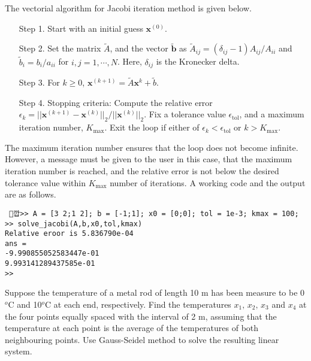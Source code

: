 \documentclass[11pt,a4paper,reqno]{article}
\begin{document}
The vectorial algorithm for Jacobi iteration method is given below. 
\begin{tcolorbox}
	[colback=magenta!5!white,colframe=pink!100!black,fonttitle=\bfseries,title=Jacobi iteration method]
	\begin{itemize}
		\item[Step 1.] Start with an initial guess ${\pmb x}^{(0)}$.
		\item[Step 2.] Set the matrix $\widetilde{A}$, and the vector $\widetilde{\pmb b}$ as $\widetilde{A}_{ij} = (\delta_{ij} - 1)A_{ij}/A_{ii}$ and $\widetilde{b}_{i} = b_{i}/a_{ii}$ for $i,j=1,\cdots,N$. Here, $\delta_{ij}$ is the Kronecker delta.
		\item[Step 3.] For $k \ge 0$, ${\pmb x}^{(k+1)} = \widetilde{A}{\pmb x}^{k} + \widetilde{b}$. 
		\item[Step 4.] Stopping criteria: Compute the relative error $\epsilon_k = ||{\pmb x}^{(k+1)} - {\pmb x}^{(k)}||_2/||{\pmb x}^{(k)}||_2$. Fix a tolerance value $\epsilon_{\mathrm{tol}}$, and a maximum iteration number, $K_{\mathrm{max}}$. Exit the loop if either of $\epsilon_k < \epsilon_{\mathrm{tol}}$ or $k > K_{\mathrm{max}}$. 
	\end{itemize}
\end{tcolorbox}
The maximum iteration number ensures that the loop does not become infinite. However, a message must be given to the user in this case, that the maximum iteration number is reached, and the relative error is not below the desired tolerance value within $K_{\max}$ number of iterations. A working code and the output are as follows.

\begin{mdframed}[style=cframe,nobreak=true,align=center]
	\begin{verbatim}
 깝>> A = [3 2;1 2]; b = [-1;1]; x0 = [0;0]; tol = 1e-3; kmax = 100;
>> solve_jacobi(A,b,x0,tol,kmax)
Relative eroor is 5.836790e-04
ans =
-9.990855052583447e-01
9.993141289437585e-01
>>
	\end{verbatim}
\end{mdframed}
\begin{problem}	 
	Suppose the temperature of a metal rod of length 10 m has been measure to be 0$^o$C and 10$^o$C at each end, respectively. Find the temperatures $x_1,\,x_2,\,x_3$ and $x_4$ at the four points equally spaced with the interval of 2 m, assuming that the temperature at each point is the average of the temperatures of both neighbouring points. Use Gauss-Seidel method to solve the resulting linear system. \label{pr:pr_3}
\end{problem}
\end{document}

